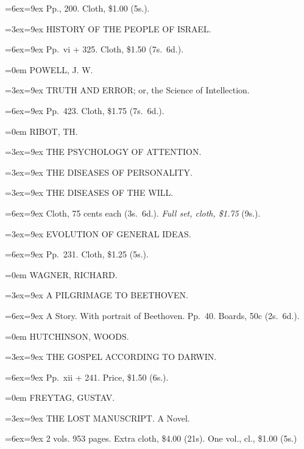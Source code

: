 \documentclass[oneside]{book}
\begin{document}
{\parindent=6ex\hangindent=9ex\footnotesize
Pp., 200. Cloth, \$1.00 (5s.).
\smallskip

\parindent=3ex\hangindent=9ex \small
HISTORY OF THE PEOPLE OF ISRAEL.
\nopagebreak

\parindent=6ex\hangindent=9ex\footnotesize
Pp.~vi + 325. Cloth, \$1.50 (7s.~6d.).
\medskip


\parindent=0em \normalsize
POWELL, J. W.

\parindent=3ex\hangindent=9ex \small
TRUTH AND ERROR; or, the Science of Intellection.
\nopagebreak

\parindent=6ex\hangindent=9ex\footnotesize
Pp.~423. Cloth, \$1.75 (7s.~6d.).
\medskip


\parindent=0em \normalsize
RIBOT, TH.
\nopagebreak

\parindent=3ex\hangindent=9ex \small
THE PSYCHOLOGY OF ATTENTION.
\smallskip

\parindent=3ex\hangindent=9ex \small
THE DISEASES OF PERSONALITY.
\smallskip

\parindent=3ex\hangindent=9ex \small
THE DISEASES OF THE WILL.
\nopagebreak

\parindent=6ex\hangindent=9ex\footnotesize
Cloth, 75 cents each (3s.~6d.). \textit{Full set, cloth, \$1.75} (9s.).
\smallskip

\parindent=3ex\hangindent=9ex \small
EVOLUTION OF GENERAL IDEAS.
\nopagebreak

\parindent=6ex\hangindent=9ex\footnotesize
Pp.~231. Cloth, \$1.25 (5s.).
\medskip


\parindent=0em \normalsize
WAGNER, RICHARD.
\nopagebreak

\parindent=3ex\hangindent=9ex \small
A PILGRIMAGE TO BEETHOVEN.
\nopagebreak

\parindent=6ex\hangindent=9ex\footnotesize
A Story. With portrait of Beethoven. Pp.~40. Boards, 50c (2s.~6d.).
\medskip


\parindent=0em \normalsize
HUTCHINSON, WOODS.

\parindent=3ex\hangindent=9ex \small
THE GOSPEL ACCORDING TO DARWIN.
\nopagebreak

\parindent=6ex\hangindent=9ex\footnotesize
Pp.~xii + 241. Price, \$1.50 (6s.).
\medskip


\parindent=0em \normalsize
FREYTAG, GUSTAV.
\nopagebreak

\parindent=3ex\hangindent=9ex \small
THE LOST MANUSCRIPT\@. A Novel.
\nopagebreak

\parindent=6ex\hangindent=9ex\footnotesize
2 vols. 953 pages. Extra cloth, \$4.00 (21s). One vol., cl., \$1.00 (5s.)
\smallskip

}
\end{document}
